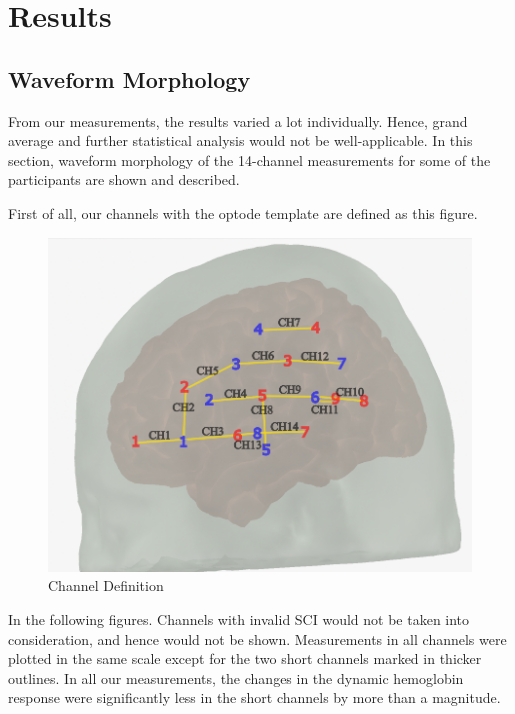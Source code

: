 \chapter{Results}
\section {Waveform Morphology}
From our measurements, the results varied a lot individually. Hence, grand average and further statistical analysis would not be well-applicable. In this section, waveform morphology of the 14-channel measurements for some of the participants are shown and described.

First of all, our channels with the optode template are defined as this figure.

\begin{figure}[H]
  \centering
    \includegraphics[scale=.48]{bilder/optode_ink.png}
  \caption{Channel Definition}
  \label{fig:somesignal}
\end{figure}

In the following figures. Channels with invalid SCI would not be taken into consideration, and hence would not be shown. Measurements in all channels were plotted in the same scale except for the two short channels marked in thicker outlines. In all our measurements, the changes in the dynamic hemoglobin response were significantly less in the short channels by more than a magnitude.

